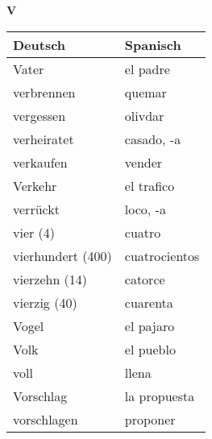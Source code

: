 \begin{flushright}\begin{Huge}\textbf{V}\end{Huge}\end{flushright}

\begin{longtable}{p{} p{}} 
\textbf{Deutsch}     & \textbf{Spanisch}                                       \\ \hline
\hline
\endhead %
Vater & el padre\\
verbrennen & quemar \\
vergessen & olivdar\\
verheiratet & casado, -a\\
verkaufen & vender\\
Verkehr & el trafico\\
verrückt & loco, -a\\
vier (4) & cuatro\\
vierhundert (400) & cuatrocientos\\
vierzehn (14) & catorce\\
vierzig (40) & cuarenta\\
Vogel & el pajaro\\
Volk & el pueblo\\
voll & llena\\
Vorschlag & la propuesta\\
vorschlagen & proponer
\end{longtable}
